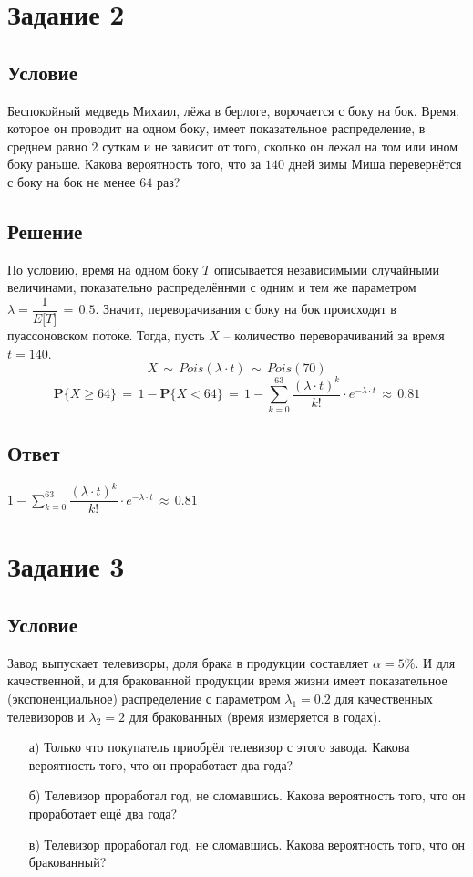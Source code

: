 \documentclass{article}
\begin{document}
\section*{Задание 2}
\subsection*{Условие}
Беспокойный медведь Михаил, лёжа в берлоге, ворочается с боку на бок. Время, которое он проводит на одном боку, имеет показательное распределение, в среднем равно $ 2 $ суткам и не зависит от того, сколько он лежал на том или ином боку раньше. Какова вероятность того, что за $ 140 $ дней зимы Миша перевернётся с боку на бок не менее $ 64 $ раз?
\subsection*{Решение}
По условию, время на одном боку $ T $ описывается независимыми случайными величинами, показательно распределённми с одним и тем же параметром $ \lambda \! = \! \dfrac{1}{E \big[ T \big]} \, = \, 0.5 $. Значит, переворачивания с боку на бок происходят в пуассоновском потоке. Тогда, пусть $ X $ -- количество переворачиваний за время $ t \! = \! 140 $.
\[ X \, \sim \, Pois(\lambda \! \cdot \! t) \, \sim \, Pois(70) \]
\[ \mathbf{P} \big\{ X \! \geqslant \! 64 \big\} \, = \, 1 \! - \! \mathbf{P} \big\{ X \! < \! 64 \big\} \, = \, 1 \! - \! \sum\limits_{k=0}^{63} \dfrac{(\lambda \! \cdot \! t)^k}{k!} \! \cdot \! e^{-\lambda \cdot t} \, \approx \, 0.81 \]
\subsection*{Ответ}
$ 1 \! - \! \sum\limits_{k=0}^{63} \dfrac{(\lambda \! \cdot \! t)^k}{k!} \! \cdot \! e^{-\lambda \cdot t} \, \approx \, 0.81 $
\section*{Задание 3}
\subsection*{Условие}
Завод выпускает телевизоры, доля брака в продукции составляет $ \alpha \! = \! 5\% $. И для качественной, и для бракованной продукции время жизни имеет показательное (экспоненциальное) распределение с параметром $ \lambda_1 \! = \! 0.2 $ для качественных телевизоров и $ \lambda_2 \! = \! 2 $ для бракованных (время измеряется в годах).
\begin{enumerate}
\item[а)] Только что покупатель приобрёл телевизор с этого завода. Какова вероятность того, что он проработает два года?
\item[б)] Телевизор проработал год, не сломавшись. Какова вероятность того, что он проработает ещё два года?
\item[в)] Телевизор проработал год, не сломавшись. Какова вероятность того, что он бракованный?
\end{enumerate}
\end{document}
